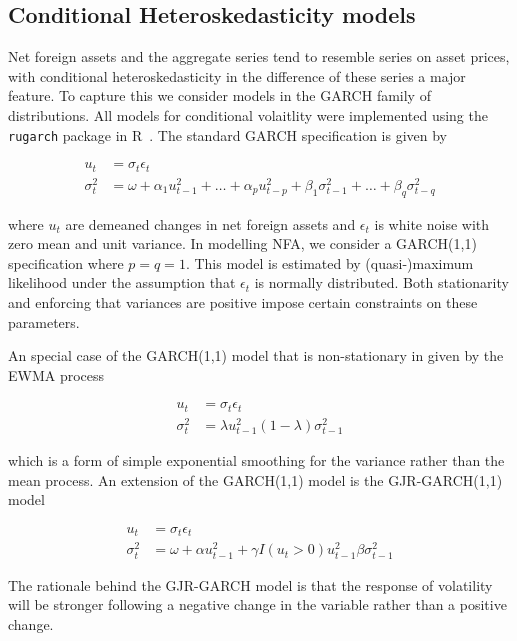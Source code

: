 \documentclass{article}
\begin{document}
\subsection{Conditional Heteroskedasticity models}

Net foreign assets and the aggregate series tend to resemble series on asset prices, with conditional heteroskedasticity in the difference of these series a major feature. To capture this we consider models in the GARCH family of distributions. All models for conditional volaitlity were implemented using the \texttt{rugarch} package in R~\citep{rugpac}. The standard GARCH specification \citep{Bol1986} is given by

\begin{align}
  u_t&=\sigma_t\epsilon_t\\
  \sigma_t^2&=\omega+\alpha_1u^2_{t-1}+\dots+\alpha_pu^2_{t-p}+\beta_1\sigma^2_{t-1}+\dots+\beta_q\sigma^2_{t-q}
\end{align}

where $u_t$ are demeaned changes in net foreign assets and $\epsilon_t$ is white noise with zero mean and unit variance. In modelling NFA, we consider a GARCH(1,1) specification where $p=q=1$. This model is estimated by (quasi-)maximum likelihood under the assumption that $\epsilon_t$ is normally distributed. Both stationarity and enforcing that variances are positive impose certain constraints on these parameters.

An special case of the GARCH(1,1) model that is non-stationary in given by the EWMA process 

\begin{align}
  u_t&=\sigma_t\epsilon_t\\
  \sigma_t^2&=\lambda u^2_{t-1}(1-\lambda)\sigma^2_{t-1}
\end{align}

which is a form of simple exponential smoothing for the variance rather than the mean process. An extension of the GARCH(1,1) model is the GJR-GARCH(1,1) model \citep{GloEtAl1993}

\begin{align}
  u_t&=\sigma_t\epsilon_t\\
  \sigma_t^2&=\omega+\alpha u^2_{t-1}+\gamma I(u_t>0)u^2_{t-1}\beta\sigma^2_{t-1}
\end{align}

The rationale behind the GJR-GARCH model is that the response of volatility will be stronger following a negative change in the variable rather than a positive change.
\end{document}
